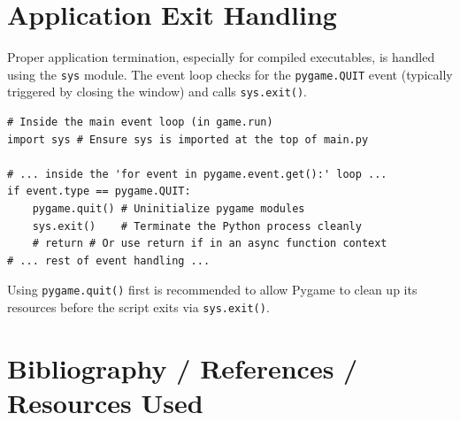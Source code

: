 \documentclass[11pt, a4paper]{article}
\begin{document}
\section{Application Exit Handling}
\label{app:exit_handle}

Proper application termination, especially for compiled executables, is handled using the \texttt{sys} module. The event loop checks for the \texttt{pygame.QUIT} event (typically triggered by closing the window) and calls \texttt{sys.exit()}.

\begin{lstlisting}[caption={Handling Quit Event in main.py}, label={lst:exit_logic}]
# Inside the main event loop (in game.run)
import sys # Ensure sys is imported at the top of main.py

# ... inside the 'for event in pygame.event.get():' loop ...
if event.type == pygame.QUIT:
    pygame.quit() # Uninitialize pygame modules
    sys.exit()    # Terminate the Python process cleanly
    # return # Or use return if in an async function context
# ... rest of event handling ...
\end{lstlisting}

Using \texttt{pygame.quit()} first is recommended to allow Pygame to clean up its resources before the script exits via \texttt{sys.exit()}.

\newpage


\section*{Bibliography / References / Resources Used}
\end{document}
